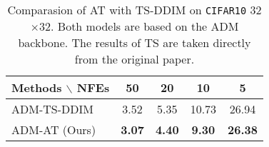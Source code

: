 \begin{table*}[h]
\centering
\caption{Comparasion of AT with TS-DDIM on \texttt{CIFAR10} 32$\times$32. Both models are based on the ADM backbone. The results of TS are taken directly from the original paper.}
\begin{tabular}{lcccc}
\toprule
    Methods $\backslash$ NFEs & 50 & 20 & 10 & 5 \\ 
    \midrule
    ADM-TS-DDIM & 3.52 & 5.35 &10.73 & 26.94  \\
    ADM-AT (Ours) & \bf{3.07} & \bf{4.40} & \bf{9.30} & \bf{26.38}  \\
    \bottomrule
    \end{tabular}
\label{tab:atvsts}
\end{table*}